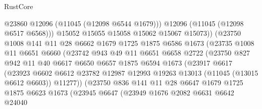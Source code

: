 \begin{lexlean}{RustCore}
\begin{coremodule}
                            @23860
                            @12096
                            (@11045 (@12098 @6544 @1679)))
                          @12096
                          (@11045 (@12098 @6517 @6568)))
                        @15052
                        @15055
                        @15058
                        @15062
                        @15067
                        @15073))
                    (@23750
                      @1008
                      @141
                      @11
                      @28
                      @6662
                      @1679
                      @1725
                      @1875
                      @6586
                      @1673
                      (@23735
                        @1008
                        @11
                        @6651
                        @6660
                        (@23742
                          @943
                          @49
                          @11
                          @6651
                          @6658
                          @2722
                          (@23750
                            @827
                            @942
                            @11
                            @40
                            @6617
                            @6650
                            @6657
                            @1875
                            @6594
                            @1673
                            (@23917
                              @6617
                              (@23923
                                @6602
                                @6612
                                @23782
                                @12987
                                @12993
                                @19263
                                @13013
                                (@11045 (@13015 @6612 @6603))
                                @11277))
                            (@23750
                              @836
                              @141
                              @11
                              @28
                              @6647
                              @1679
                              @1725
                              @1875
                              @6623
                              @1673
                              (@23945
                                @6647
                                (@23949
                                  @1676
                                  @2082
                                  @6631
                                  @6642
                                  @24040

\end{coremodule}
\end{lexlean}
